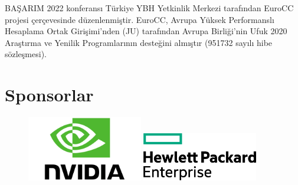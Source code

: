 \begin{center}
BAŞARIM 2022 konferansı Türkiye YBH Yetkinlik Merkezi tarafından EuroCC projesi çerçevesinde düzenlenmiştir. EuroCC, Avrupa Yüksek Performanslı Hesaplama Ortak Girişimi'nden (JU) tarafından Avrupa Birliği'nin Ufuk 2020 Araştırma ve Yenilik Programlarının desteğini almıştır (951732 sayılı hibe sözleşmesi).
\end{center}

\vfill

\section{Sponsorlar}

\begin{figure}[!h]
\includegraphics[width=0.45\textwidth]{Nvidia-logo.png}
\includegraphics[width=0.45\textwidth]{hpe_pri_grn_pos_rgb.png}
\end{figure}

\vfill
